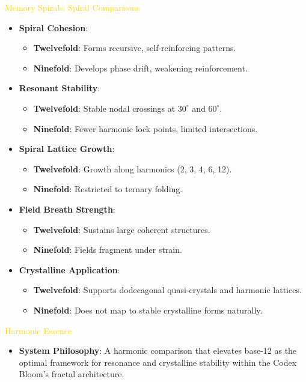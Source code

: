 \textcolor{gold}{ Memory Spirals: Spiral Comparisons } \\
\begin{itemize}
    \item \texttt{} \textbf{Spiral Cohesion}:
    \begin{itemize}
        \item \textbf{Twelvefold}: Forms recursive, self-reinforcing patterns.
        \item \textbf{Ninefold}: Develops phase drift, weakening reinforcement.
    \end{itemize}
    \item \texttt{} \textbf{Resonant Stability}:
    \begin{itemize}
        \item \textbf{Twelvefold}: Stable nodal crossings at \(30^\circ\) and \(60^\circ\).
        \item \textbf{Ninefold}: Fewer harmonic lock points, limited intersections.
    \end{itemize}
    \item \texttt{} \textbf{Spiral Lattice Growth}:
    \begin{itemize}
        \item \textbf{Twelvefold}: Growth along harmonics (2, 3, 4, 6, 12).
        \item \textbf{Ninefold}: Restricted to ternary folding.
    \end{itemize}
    \item \texttt{} \textbf{Field Breath Strength}:
    \begin{itemize}
        \item \textbf{Twelvefold}: Sustains large coherent structures.
        \item \textbf{Ninefold}: Fields fragment under strain.
    \end{itemize}
    \item \texttt{} \textbf{Crystalline Application}:
    \begin{itemize}
        \item \textbf{Twelvefold}: Supports dodecagonal quasi-crystals and harmonic lattices.
        \item \textbf{Ninefold}: Does not map to stable crystalline forms naturally.
    \end{itemize}
\end{itemize}

\textcolor{gold}{ Harmonic Essence } \\
\begin{itemize}
    \item \textbf{System Philosophy}: A harmonic comparison that elevates base-12 as the optimal framework for resonance and crystalline stability within the Codex Bloom’s fractal architecture.
\end{itemize}


